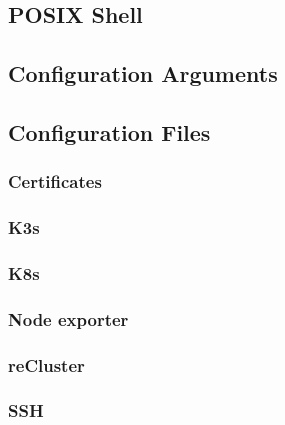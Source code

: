 \subsection{POSIX Shell}
\label{subsec:implementation_installer_posix_shell}

\subsection{Configuration Arguments}
\label{subsec:implementation_installer_configuration_arguments}

\subsection{Configuration Files}
\label{subsec:implementation_installer_configuration_files}

\subsubsection{Certificates}
\label{subsubsec:implementation_installer_configuration_files_certificates}

\subsubsection{K3s}
\label{subsubsec:implementation_installer_configuration_files_k3s}

\subsubsection{K8s}
\label{subsubsec:implementation_installer_configuration_filesn_k8s}

\subsubsection{Node exporter}
\label{subsubsec:implementation_installer_configuration_files_node_exporter}

\subsubsection{reCluster}
\label{subsubsec:implementation_installer_configuration_files_recluster}

\subsubsection{SSH}
\label{subsubsec:implementation_installer_configuration_files_ssh}

